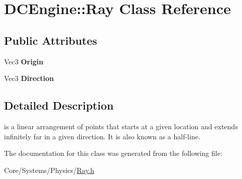 \hypertarget{structDCEngine_1_1Ray}{\section{D\-C\-Engine\-:\-:Ray Class Reference}
\label{structDCEngine_1_1Ray}
}
\subsection*{Public Attributes}
\begin{DoxyCompactItemize}
\item 
\hypertarget{structDCEngine_1_1Ray_a1814a8a686ca61348ef179a993f9c1e2}{Vec3 {\bfseries Origin}}\label{structDCEngine_1_1Ray_a1814a8a686ca61348ef179a993f9c1e2}

\item 
\hypertarget{structDCEngine_1_1Ray_a2aeae2caf3796c93f8a20f3bf7978464}{Vec3 {\bfseries Direction}}\label{structDCEngine_1_1Ray_a2aeae2caf3796c93f8a20f3bf7978464}

\end{DoxyCompactItemize}


\subsection{Detailed Description}
is a linear arrangement of points that starts at a given location and extends infinitely far in a given direction. It is also known as a half-\/line. 

The documentation for this class was generated from the following file\-:\begin{DoxyCompactItemize}
\item 
Core/\-Systems/\-Physics/\hyperlink{Ray_8h}{Ray.\-h}\end{DoxyCompactItemize}
